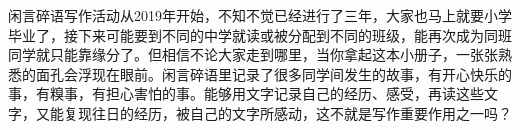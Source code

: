 \markdownRendererDocumentBegin
{}\markdownRendererInterblockSeparator
{}闲言碎语写作活动从2019年开始，不知不觉已经进行了三年，大家也马上就要小学毕业了，接下来可能要到不同的中学就读或被分配到不同的班级，能再次成为同班同学就只能靠缘分了。但相信不论大家走到哪里，当你拿起这本小册子，一张张熟悉的面孔会浮现在眼前。闲言碎语里记录了很多同学间发生的故事，有开心快乐的事，有糗事，有担心害怕的事。能够用文字记录自己的经历、感受，再读这些文字，又能复现往日的经历，被自己的文字所感动，这不就是写作重要作用之一吗？\markdownRendererDocumentEnd